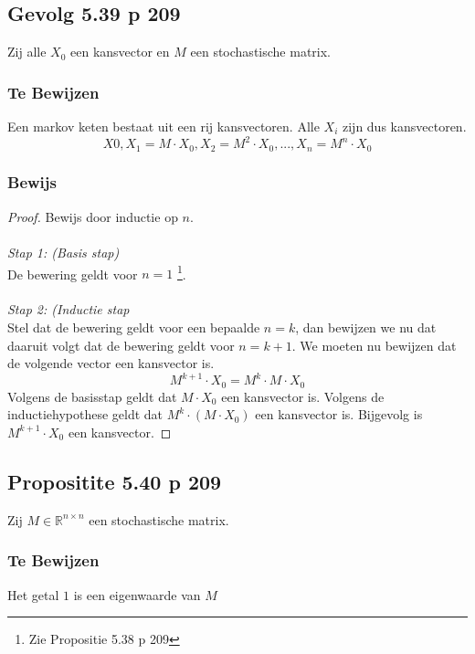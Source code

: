 \documentclass[lineaire_algebra_oplossingen.tex]{subfiles}
\begin{document}
\subsection{Gevolg 5.39 p 209}
Zij alle $X_0$ een kansvector en $M$ een stochastische matrix.
\subsubsection*{Te Bewijzen}
Een markov keten bestaat uit een rij kansvectoren. Alle $X_i$ zijn dus kansvectoren.
\[
X0, X_1 = M\cdot X_0, X_2 = M^2\cdot X_0,...,X_n = M^n\cdot X_0
\]
\subsubsection*{Bewijs}
\begin{proof}
Bewijs door inductie op $n$.\\\\
\emph{Stap 1: (Basis stap)}\\
De bewering geldt voor $n=1$ \footnote{Zie Propositie 5.38 p 209}.\\\\
\emph{Stap 2: (Inductie stap}\\
Stel dat de bewering geldt voor een bepaalde $n=k$, dan bewijzen we nu dat daaruit volgt dat de bewering geldt voor $n=k+1$.
We moeten nu bewijzen dat de volgende vector een kansvector is.
\[
M^{k+1}\cdot X_0 = M^{k}\cdot M\cdot X_0
\]
Volgens de basisstap geldt dat $M\cdot X_0$ een kansvector is. Volgens de inductiehypothese geldt dat $M^{k}\cdot (M\cdot X_0)$ een kansvector is. Bijgevolg is $M^{k+1}\cdot X_0$ een kansvector.
\end{proof}

\subsection{Propositite 5.40 p 209}
Zij $M\in \mathbb{R}^{n\times n}$ een stochastische matrix.
\subsubsection*{Te Bewijzen}
Het getal $1$ is een eigenwaarde van $M$
\end{document}
